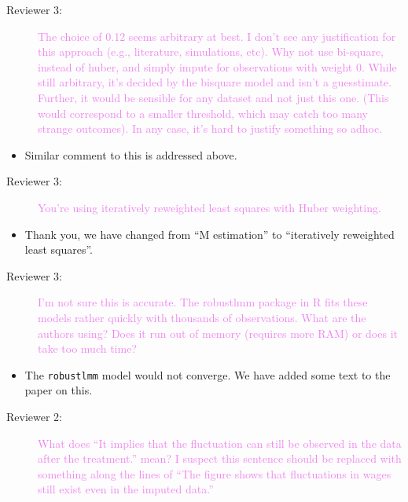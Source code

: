 \documentclass[12pt,a4paper,]{article}
\providecommand{\tightlist}{%
  \setlength{\itemsep}{0pt}\setlength{\parskip}{0pt}}
\begin{document}
\begin{description}
\item[Reviewer 3:]\textcolor{violet}{The choice of 0.12 seems arbitrary at best. I don’t see any justification for this approach (e.g., literature, simulations, etc). Why not use bi-square, instead of huber, and simply impute for observations with weight 0. While still arbitrary, it’s decided by the bisquare model and isn’t a guesstimate. Further, it would be sensible for any dataset and not just this one. (This would correspond to a smaller threshold, which may catch too many strange outcomes). In any case, it’s hard to justify something so adhoc.}
\end{description}

\begin{itemize}
\tightlist
\item
  Similar comment to this is addressed above.
\end{itemize}

\begin{description}
\item[Reviewer 3:]\textcolor{violet}{You’re using iteratively reweighted least squares with Huber weighting.} 
\end{description}

\begin{itemize}
\tightlist
\item
  Thank you, we have changed from \enquote{M estimation} to \enquote{iteratively reweighted least squares}.
\end{itemize}

\begin{description}
\item[Reviewer 3:]\textcolor{violet}{I’m not sure this is accurate. The robustlmm package in R fits these models rather quickly with thousands of observations. What are the authors using? Does it run out of memory (requires more RAM) or does it take too much time?}
\end{description}

\begin{itemize}
\tightlist
\item
  The \texttt{robustlmm} model would not converge. We have added some text to the paper on this.
\end{itemize}

\begin{description}
\item[Reviewer 2:]\textcolor{violet}{What does “It implies that the fluctuation can still be observed in the data after the treatment.” mean? I suspect this sentence should be replaced with something along the lines of “The figure shows that fluctuations in wages still exist even in the imputed data.”}
\end{description}
\end{document}
